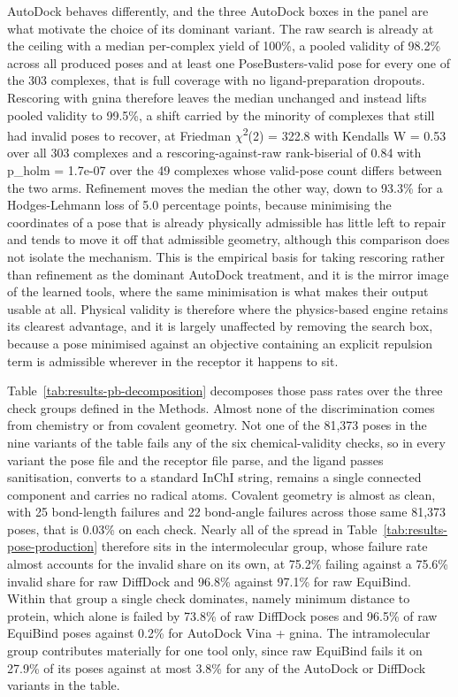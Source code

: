 AutoDock behaves differently, and the three AutoDock boxes in the panel are what motivate the choice of its dominant variant. The raw search is already at the ceiling with a median per-complex yield of 100\%, a pooled validity of 98.2\% across all produced poses and at least one PoseBusters-valid pose for every one of the 303 complexes, that is full coverage with no ligand-preparation dropouts. Rescoring with gnina therefore leaves the median unchanged and instead lifts pooled validity to 99.5\%, a shift carried by the minority of complexes that still had invalid poses to recover, at Friedman \ensuremath{\chi}\textsuperscript{2}(2) = 322.8 with Kendall\textquotesingle s W = 0.53 over all 303 complexes and a rescoring-against-raw rank-biserial of 0.84 with p\_holm = 1.7e-07 over the 49 complexes whose valid-pose count differs between the two arms. Refinement moves the median the other way, down to 93.3\% for a Hodges-Lehmann loss of 5.0 percentage points, because minimising the coordinates of a pose that is already physically admissible has little left to repair and tends to move it off that admissible geometry, although this comparison does not isolate the mechanism. This is the empirical basis for taking rescoring rather than refinement as the dominant AutoDock treatment, and it is the mirror image of the learned tools, where the same minimisation is what makes their output usable at all. Physical validity is therefore where the physics-based engine retains its clearest advantage, and it is largely unaffected by removing the search box, because a pose minimised against an objective containing an explicit repulsion term is admissible wherever in the receptor it happens to sit.

Table~\ref{tab:results-pb-decomposition} decomposes those pass rates over the three check groups defined in the Methods. Almost none of the discrimination comes from chemistry or from covalent geometry. Not one of the 81,373 poses in the nine variants of the table fails any of the six chemical-validity checks, so in every variant the pose file and the receptor file parse, and the ligand passes sanitisation, converts to a standard InChI string, remains a single connected component and carries no radical atoms. Covalent geometry is almost as clean, with 25 bond-length failures and 22 bond-angle failures across those same 81,373 poses, that is 0.03\% on each check. Nearly all of the spread in Table~\ref{tab:results-pose-production} therefore sits in the intermolecular group, whose failure rate almost accounts for the invalid share on its own, at 75.2\% failing against a 75.6\% invalid share for raw DiffDock and 96.8\% against 97.1\% for raw EquiBind. Within that group a single check dominates, namely minimum distance to protein, which alone is failed by 73.8\% of raw DiffDock poses and 96.5\% of raw EquiBind poses against 0.2\% for AutoDock Vina + gnina. The intramolecular group contributes materially for one tool only, since raw EquiBind fails it on 27.9\% of its poses against at most 3.8\% for any of the AutoDock or DiffDock variants in the table.

